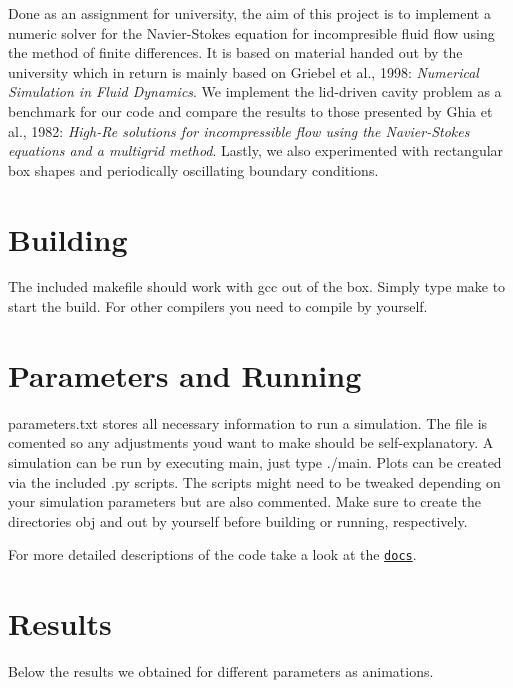 Done as an assignment for university, the aim of this project is to implement a numeric solver for the Navier-\/\+Stokes equation for incompresible fluid flow using the method of finite differences. It is based on material handed out by the university which in return is mainly based on Griebel et al., 1998\+: {\itshape Numerical Simulation in Fluid Dynamics}. We implement the lid-\/driven cavity problem as a benchmark for our code and compare the results to those presented by Ghia et al., 1982\+: {\itshape High-\/\+Re solutions for incompressible flow using the Navier-\/\+Stokes equations and a multigrid method}. Lastly, we also experimented with rectangular box shapes and periodically oscillating boundary conditions.

 

 

\section*{Building}

The included makefile should work with gcc out of the box. Simply type {\ttfamily make} to start the build. For other compilers you need to compile by yourself.

\section*{Parameters and Running}

{\ttfamily parameters.\+txt} stores all necessary information to run a simulation. The file is comented so any adjustments you\textquotesingle{}d want to make should be self-\/explanatory. A simulation can be run by executing {\ttfamily main}, just type {\ttfamily ./main}. Plots can be created via the included {\ttfamily .py} scripts. The scripts might need to be tweaked depending on your simulation parameters but are also commented. Make sure to create the directories {\ttfamily obj} and {\ttfamily out} by yourself before building or running, respectively.

For more detailed descriptions of the code take a look at the \href{https://captainproton42.github.io/NavierStokes/}{\tt docs}.

\section*{Results}

Below the results we obtained for different parameters as animations.

